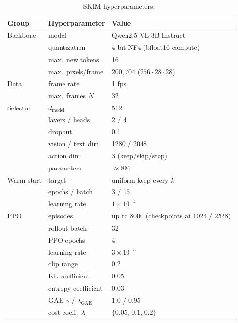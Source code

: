 \documentclass{article}
\begin{document}
\begin{table}[h]
  \caption{SKIM hyperparameters.}
  \label{tab:hparams}
  \centering
  \begin{tabular}{lll}
    \toprule
    Group & Hyperparameter & Value \\
    \midrule
    Backbone   & model                & Qwen2.5-VL-3B-Instruct \\
               & quantization         & 4-bit NF4 (bfloat16 compute) \\
               & max.\ new tokens     & 16 \\
               & max.\ pixels/frame   & $200{,}704$ ($256\cdot28\cdot28$) \\
    \midrule
    Data       & frame rate           & 1 fps \\
               & max.\ frames $N$     & 32 \\
    \midrule
    Selector   & $d_\text{model}$     & 512 \\
               & layers / heads       & 2 / 4 \\
               & dropout              & 0.1 \\
               & vision / text dim    & 1280 / 2048 \\
               & action dim           & 3 (keep/skip/stop) \\
               & parameters           & ${\approx}8$M \\
    \midrule
    Warm-start & target               & uniform keep-every-$k$ \\
               & epochs / batch       & 3 / 16 \\
               & learning rate        & $1\times10^{-4}$ \\
    \midrule
    PPO        & episodes             & up to 8000 (checkpoints at 1024 / 2528) \\
               & rollout batch        & 32 \\
               & PPO epochs           & 4 \\
               & learning rate        & $3\times10^{-5}$ \\
               & clip range           & 0.2 \\
               & KL coefficient       & 0.05 \\
               & entropy coefficient  & 0.03 \\
               & GAE $\gamma$ / $\lambda_\text{GAE}$ & 1.0 / 0.95 \\
               & cost coeff.\ $\lambda$ & $\{0.05,\,0.1,\,0.2\}$ \\
    \bottomrule
  \end{tabular}
\end{table}

\newpage

\end{document}
